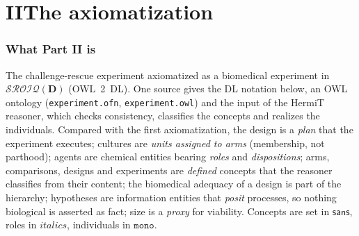 \documentclass[10pt,a4paper]{article}
\begin{document}
\part*{II\quad The axiomatization}

\section*{What Part II is}
The challenge-rescue experiment axiomatized as a biomedical experiment in $\mathcal{SROIQ}(\mathbf{D})$ (OWL~2~DL).
One source gives the DL notation below, an OWL ontology (\texttt{experiment.ofn}, \texttt{experiment.owl}) and the
input of the HermiT reasoner, which checks consistency, classifies the concepts and realizes the individuals.
Compared with the first axiomatization, the design is a \emph{plan} that the experiment executes; cultures are
\emph{units assigned to arms} (membership, not parthood); agents are chemical entities bearing \emph{roles} and
\emph{dispositions}; arms, comparisons, designs and experiments are \emph{defined} concepts that the reasoner
classifies from their content; the biomedical adequacy of a design is part of the hierarchy; hypotheses are
information entities that \emph{posit} processes, so nothing biological is asserted as fact; size is a
\emph{proxy} for viability. Concepts are set in $\mathsf{sans}$, roles in $\mathit{italics}$, individuals in
$\mathtt{mono}$.
\end{document}
